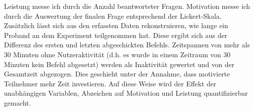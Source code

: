 Leistung messe ich durch die Anzahl beantworteter Fragen. Motivation messe ich durch die Auswertung der finalen Frage entsprechend der Lickert-Skala. Zusätzlich lässt sich aus den erfassten Daten rekonstruieren, wie lange ein Proband an dem Experiment teilgenommen hat. Diese ergibt sich aus der Differenz des ersten und letzten abgeschickten Befehls. Zeitspannen von mehr als 30 Minuten ohne Nutzeraktivität (d.h. es wurde in einem Zeitraum von 30 Minuten kein Befehl abgesetzt) werden als Inaktivität gewertet und von der Gesamtzeit abgezogen. Dies geschieht unter der Annahme, dass motivierte Teilnehmer mehr Zeit investieren. Auf diese Weise wird der Effekt der unabhängigen Variablen, Abzeichen auf Motivation und Leistung quantifizierbar gemacht.